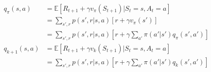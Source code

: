 \documentclass{article}
\begin{document}
\[
  \begin{aligned}
    q_{\pi}(s,a) &= \mathbb{E}[R_{t+1} + \gamma v_{\pi}(S_{t+1}) | S_{t}=s, A_{t}=a]\\
    &= \sum_{s',r}p(s',r|s,a)[r + \gamma v_{\pi}(s')]\\
    &= \sum_{s',r}p(s',r|s,a)[r + \gamma \sum_{a'}\pi(a'|s')q_{\pi}(s',a')]\\
    q_{k+1}(s, a) &= \mathbb{E}[R_{t+1} + \gamma v_{k}(S_{t+1}) | S_{t}=s, A_{t}=a]\\
    &= \sum_{s',r}p(s',r|s,a)[r + \gamma \sum_{a'}\pi(a'|s')q_{k}(s',a')]
  \end{aligned}
\]
\end{document}
